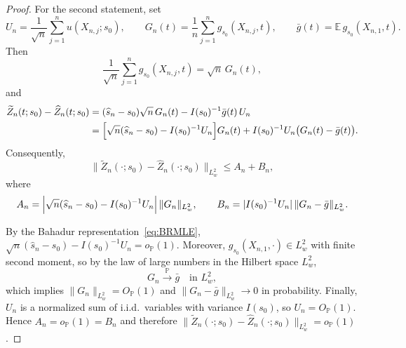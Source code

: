\documentclass{article}
\theoremstyle{thm}
\theoremstyle{def}
\begin{document}
\begin{proof}
\smallskip
For the second statement, set
\[
  U_n = \frac{1}{\sqrt{n}}\sum_{j=1}^n u(X_{n,j};s_0),\qquad
  G_n(t) = \frac{1}{n}\sum_{j=1}^n g_{s_0}(X_{n,j},t),\qquad
  \bar g(t) = \mathbb{E}\,g_{s_0}(X_{n,1},t).
\]
Then
\[
  \frac{1}{\sqrt{n}}\sum_{j=1}^n g_{s_0}(X_{n,j},t)
  = \sqrt{n}\,G_n(t),
\]
and
\begin{align*}
  \widetilde Z_n(t;s_0)-\widehat Z_n(t;s_0)
   &= (\widehat{s}_n-s_0)\sqrt{n}\,G_n(t)
      - I(s_0)^{-1}\bar g(t)\,U_n \\
   &= \Bigl[\sqrt{n}(\widehat{s}_n-s_0)-I(s_0)^{-1}U_n\Bigr]G_n(t)
      + I(s_0)^{-1}U_n\bigl(G_n(t)-\bar g(t)\bigr).
\end{align*}
Consequently,
\[
  \bigl\|\widetilde Z_n(\cdot;s_0)-\widehat Z_n(\cdot;s_0)\bigr\|_{L_w^2}
  \le A_n + B_n,
\]
where
\[
  A_n = \Bigl|\sqrt{n}(\widehat{s}_n-s_0)-I(s_0)^{-1}U_n\Bigr|\,
         \|G_n\|_{L_w^2},
  \qquad
  B_n = |I(s_0)^{-1}U_n|\,
         \|G_n-\bar g\|_{L_w^2}.
\]

By the Bahadur representation~\eqref{eq:BRMLE},
$\sqrt{n}(\widehat{s}_n-s_0)-I(s_0)^{-1}U_n=o_{\mathbb{P}}(1)$.
Moreover, $g_{s_0}(X_{n,1},\cdot)\in L_w^2$ with finite second moment, so
by the law of large numbers in the Hilbert space $L_w^2$,
\[
  G_n \xrightarrow{\mathbb{P}} \bar g
  \quad\text{in }L_w^2,
\]
which implies $\|G_n\|_{L_w^2}=O_{\mathbb{P}}(1)$ and
$\|G_n-\bar g\|_{L_w^2}\to0$ in probability. Finally, $U_n$ is a
normalized sum of i.i.d.\ variables with variance $I(s_0)$, so
$U_n=O_{\mathbb{P}}(1)$. Hence $A_n = o_{\mathbb{P}}(1)= B_n$ and therefore $\bigl\|\widetilde Z_n(\cdot;s_0)-\widehat Z_n(\cdot;s_0)\bigr\|_{L_w^2} = o_{\mathbb{P}}(1)$.
\end{proof}
\end{document}

